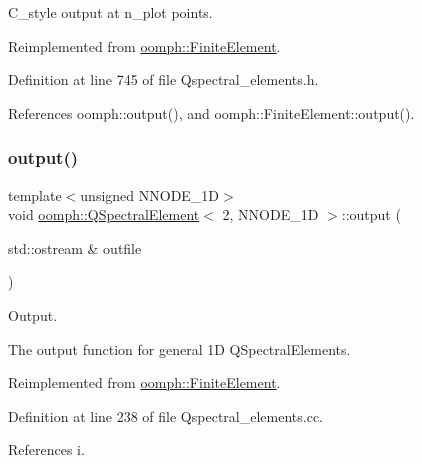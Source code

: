 C\+\_\+style output at n\+\_\+plot points. 



Reimplemented from \hyperlink{classoomph_1_1FiniteElement_adfaee690bb0608f03320eeb9d110d48c}{oomph\+::\+Finite\+Element}.



Definition at line 745 of file Qspectral\+\_\+elements.\+h.



References oomph\+::output(), and oomph\+::\+Finite\+Element\+::output().

\mbox{\label{classoomph_1_1QSpectralElement_3_012_00_01NNODE__1D_01_4_ab93d5c85d725fe3a0a8e875481847759}} 
\subsubsection{\texorpdfstring{output()}{output()}\hspace{0.1cm}{\footnotesize\ttfamily [3/4]}}
{\footnotesize\ttfamily template$<$unsigned N\+N\+O\+D\+E\+\_\+1D$>$ \\
void \hyperlink{classoomph_1_1QSpectralElement}{oomph\+::\+Q\+Spectral\+Element}$<$ 2, N\+N\+O\+D\+E\+\_\+1D $>$\+::output (\begin{DoxyParamCaption}\item[{std\+::ostream \&}]{outfile }\end{DoxyParamCaption})\hspace{0.3cm}{\ttfamily [virtual]}}



Output. 

The output function for general 1D Q\+Spectral\+Elements. 

Reimplemented from \hyperlink{classoomph_1_1FiniteElement_a2ad98a3d2ef4999f1bef62c0ff13f2a7}{oomph\+::\+Finite\+Element}.



Definition at line 238 of file Qspectral\+\_\+elements.\+cc.



References i.

\mbox{\label{classoomph_1_1QSpectralElement_3_012_00_01NNODE__1D_01_4_aefe5742afd0ad13d39e78518144a941d}} 
